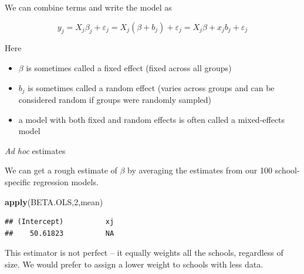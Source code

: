 \documentclass[ignorenonframetext,]{beamer}
\newenvironment{Shaded}{\begin{snugshade}}{\end{snugshade}}
\newcommand{\KeywordTok}[1]{\textcolor[rgb]{0.13,0.29,0.53}{\textbf{#1}}}
\newcommand{\DecValTok}[1]{\textcolor[rgb]{0.00,0.00,0.81}{#1}}
\newcommand{\NormalTok}[1]{#1}
\providecommand{\tightlist}{%
  \setlength{\itemsep}{0pt}\setlength{\parskip}{0pt}}
\begin{document}
\begin{frame}{}

We can combine terms and write the model as

\[y_j=X_j\beta_j+\varepsilon_j=X_j(\beta+b_j)+\varepsilon_j=X_j\beta+x_jb_j+\varepsilon_j\]

Here

\begin{itemize}
\tightlist
\item
  \(\beta\) is sometimes called a fixed effect (fixed across all groups)
\item
  \(b_j\) is sometimes called a random effect (varies across groups and
  can be considered random if groups were randomly sampled)
\item
  a model with both fixed and random effects is often called a
  mixed-effects model
\end{itemize}

\end{frame}

\begin{frame}[fragile]{\emph{Ad hoc} estimates}

We can get a rough estimate of \(\beta\) by averaging the estimates from
our 100 school-specific regression models.

\begin{Shaded}
\begin{Highlighting}[]
\KeywordTok{apply}\NormalTok{(BETA.OLS,}\DecValTok{2}\NormalTok{,mean)}
\end{Highlighting}
\end{Shaded}

\begin{verbatim}
## (Intercept)          xj 
##    50.61823          NA
\end{verbatim}

This estimator is not perfect -- it equally weights all the schools,
regardless of size. We would prefer to assign a lower weight to schools
with less data.

\end{frame}
\end{document}
